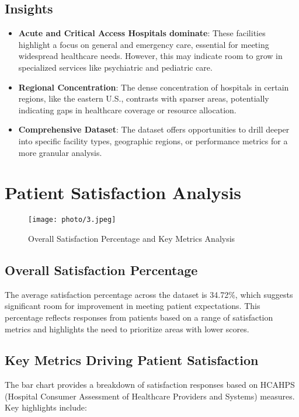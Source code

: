 \subsection{Insights}
\begin{itemize}
    \item \textbf{Acute and Critical Access Hospitals dominate}: These facilities highlight a focus on general and emergency care, essential for meeting widespread healthcare needs. However, this may indicate room to grow in specialized services like psychiatric and pediatric care.
    \item \textbf{Regional Concentration}: The dense concentration of hospitals in certain regions, like the eastern U.S., contrasts with sparser areas, potentially indicating gaps in healthcare coverage or resource allocation.
    \item \textbf{Comprehensive Dataset}: The dataset offers opportunities to drill deeper into specific facility types, geographic regions, or performance metrics for a more granular analysis.
\end{itemize}


\section{Patient Satisfaction Analysis}

\begin{figure}[ht]
    \centering
    \texttt{[image: photo/3.jpeg]} %
    \caption{Overall Satisfaction Percentage and Key Metrics Analysis}
    \label{fig:satisfaction_analysis}
\end{figure}

\subsection{Overall Satisfaction Percentage}
The average satisfaction percentage across the dataset is 34.72\%, which suggests significant room for improvement in meeting patient expectations. This percentage reflects responses from patients based on a range of satisfaction metrics and highlights the need to prioritize areas with lower scores.

\subsection{Key Metrics Driving Patient Satisfaction}
The bar chart provides a breakdown of satisfaction responses based on HCAHPS (Hospital Consumer Assessment of Healthcare Providers and Systems) measures. Key highlights include:


